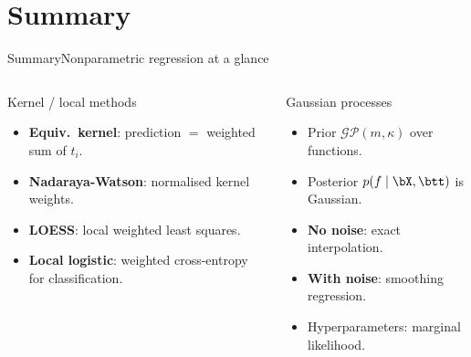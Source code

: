 \section{Summary}

\begin{frame}{Summary}{Nonparametric regression at a glance}
  \begin{columns}[t]
      \begin{block}{Kernel / local methods}
        \begin{itemize}
          \item \textbf{Equiv.\ kernel}: prediction $=$ weighted sum of $t_i$.
          \item \textbf{Nadaraya-Watson}: normalised kernel weights.
          \item \textbf{LOESS}: local weighted least squares.
          \item \textbf{Local logistic}: weighted cross-entropy for classification.
        \end{itemize}
      \end{block}
      \begin{block}{Gaussian processes}
        \begin{itemize}
          \item Prior $\mathcal{GP}(m,\kappa)$ over functions.
          \item Posterior $p(f\mid\bX,\btt)$ is Gaussian.
          \item \textbf{No noise}: exact interpolation.
          \item \textbf{With noise}: smoothing regression.
          \item Hyperparameters: marginal likelihood.
        \end{itemize}
      \end{block}
  \end{columns}
\end{frame}

